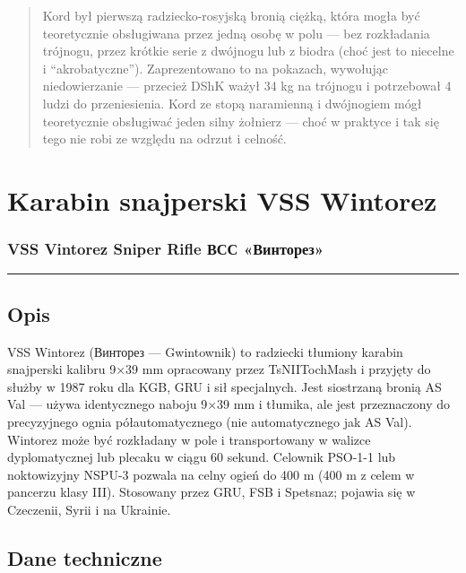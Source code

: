 \documentclass[12pt,openany,oneside]{book}
\begin{document}
\begin{quote}
Kord był pierwszą radziecko-rosyjską bronią ciężką, która mogła być
teoretycznie obsługiwana przez jedną osobę w polu --- bez rozkładania
trójnogu, przez krótkie serie z dwójnogu lub z biodra (choć jest to
niecelne i ``akrobatyczne''). Zaprezentowano to na pokazach, wywołując
niedowierzanie --- przecież DShK ważył 34 kg na trójnogu i potrzebował 4
ludzi do przeniesienia. Kord ze stopą naramienną i dwójnogiem mógł
teoretycznie obsługiwać jeden silny żołnierz --- choć w praktyce i tak
się tego nie robi ze względu na odrzut i celność.
\end{quote}

\chapter{Karabin snajperski VSS
Wintorez}\label{karabin-snajperski-vss-wintorez}

\subsection{VSS Vintorez Sniper Rifle \textbar{} ВСС
«Винторез»}\label{vss-vintorez-sniper-rifle-ux432ux441ux441-ux432ux438ux43dux442ux43eux440ux435ux437}

\begin{center}\rule{0.5\linewidth}{0.5pt}\end{center}

\section{Opis}\label{opis-61}

VSS Wintorez (Винторез --- Gwintownik) to radziecki tłumiony karabin
snajperski kalibru 9×39 mm opracowany przez TsNIITochMash i przyjęty do
służby w 1987 roku dla KGB, GRU i sił specjalnych. Jest siostrzaną
bronią AS Val --- używa identycznego naboju 9×39 mm i tłumika, ale jest
przeznaczony do precyzyjnego ognia półautomatycznego (nie automatycznego
jak AS Val). Wintorez może być rozkładany w pole i transportowany w
walizce dyplomatycznej lub plecaku w ciągu 60 sekund. Celownik PSO-1-1
lub noktowizyjny NSPU-3 pozwala na celny ogień do 400 m (400 m z celem w
pancerzu klasy III). Stosowany przez GRU, FSB i Spetsnaz; pojawia się w
Czeczenii, Syrii i na Ukrainie.

\section{Dane techniczne}\label{dane-techniczne-61}
\end{document}
